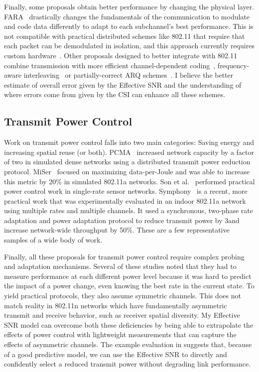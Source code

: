 Finally, some proposals obtain better performance by changing the physical layer. FARA~\cite{Rahul_FARA} drastically changes the fundamentals of the communication to modulate and code data differently to adapt to each subchannel's best performance. This is not compatible with practical distributed schemes like 802.11 that require that each packet can be demodulated in isolation, and this approach currently requires custom hardware~\cite{Rahul_SWIFT}. Other proposals designed to better integrate with 802.11 combine transmission with more efficient channel-dependent coding~\cite{Lin_ZipTX}, frequency-aware interleaving~\cite{Bhartia_FreqDiv} or partially-correct ARQ schemes~\cite{Jamieson_PPR}. I believe the better estimate of overall error given by the Effective SNR and the understanding of where errors come from given by the CSI can enhance all these schemes.

\subsection{Transmit Power Control}
Work on transmit power control falls into two main categories: Saving energy and increasing spatial reuse (or both). PCMA~\cite{Monks_PowerMAC} increased network capacity by a factor of two in simulated dense networks using a distributed transmit power reduction protocol. MiSer~\cite{Qiao_MiSer} focused on maximizing data-per-Joule and was able to increase this metric by 20\% in simulated 802.11a networks. Son et al.~\cite{Son_PowerStudy} performed practical power control work in single-rate sensor networks. Symphony~\cite{Ramachandran_Symphony} is a recent, more practical work that was experimentally evaluated in an indoor 802.11a network using multiple rates and multiple channels. It used a synchronous, two-phase rate adaptation and power adaptation protocol to reduce transmit power by 3\dB and increase network-wide throughput by 50\%. These are a few representative samples of a wide body of work.

Finally, all these proposals for transmit power control require complex probing and adaptation mechanisms. Several of these studies noted that they had to measure performance at each different power level because it was hard to predict the impact of a power change, even knowing the best rate in the current state. To yield practical protocols, they also assume symmetric channels. This does not match reality in 802.11n networks which have fundamentally asymmetric transmit and receive behavior, such as receiver spatial diversity. My Effective SNR model can overcome both these deficiencies by being able to extrapolate the effects of power control with lightweight measurements that can capture the effects of asymmetric channels. The example evaluation in  suggests that, because of a good predictive model, we can use the Effective SNR to directly and confidently select a reduced transmit power without degrading link performance.

